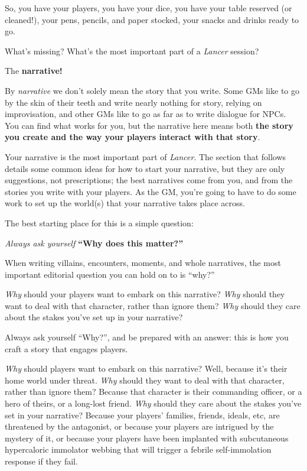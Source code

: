 So, you have your players, you have your dice, you have your table reserved (or cleaned!), your
pens, pencils, and paper stocked, your snacks and drinks ready to go.

What’s missing? What’s the most important part of a \textit{Lancer} session?

The \textbf{narrative!}

By \textit{narrative} we don’t solely mean the story that you write. Some GMs like to go by the skin of
their teeth and write nearly nothing for story, relying on improvisation, and other GMs like to go
as far as to write dialogue for NPCs. You can find what works for you, but the narrative here
means both \textbf{the story you create and the way your players interact with that story}.

Your narrative is the most important part of \textit{Lancer}. The section that follows details some
common ideas for how to start your narrative, but they are only suggestions, not prescriptions;
the best narratives come from you, and from the stories you write with your players. As the GM,
you’re going to have to do some work to set up the world(s) that your narrative takes place
across.

The best starting place for this is a simple question:

\textit{Always ask yourself}  \textbf{“Why does this matter?”}

When writing villains, encounters, moments, and whole narratives, the most important editorial
question you can hold on to is “why?”

\textit{Why} should your players want to embark on this narrative? \textit{Why} should they want to deal with
that character, rather than ignore them? \textit{Why} should they care about the stakes you’ve set up in
your narrative?

Always ask yourself “Why?”, and be prepared with an answer: this is how you craft a story that
engages players.

\textit{Why} should players want to embark on this narrative? Well, because it’s their home world under
threat. \textit{Why} should they want to deal with that character, rather than ignore them? Because that
character is their commanding officer, or a hero of theirs, or a long-lost friend. \textit{Why} should they
care about the stakes you’ve set in your narrative? Because your players’ families, friends,
ideals, etc, are threatened by the antagonist, or because your players are intrigued by the
mystery of it, or because your players have been implanted with subcutaneous hypercaloric
immolator webbing that will trigger a febrile self-immolation response if they fail.

